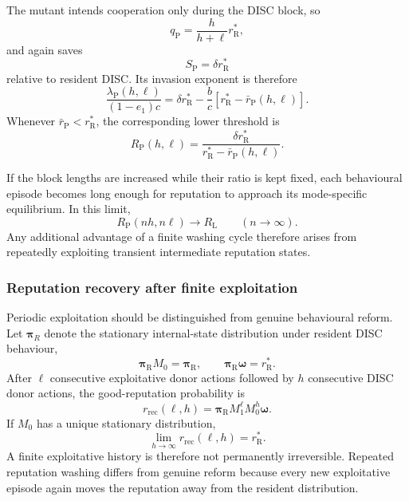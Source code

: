 \documentclass[fleqn,10pt]{wlscirep}
\begin{document}
The mutant intends cooperation only during the DISC block, so
\begin{equation}
q_\mathrm P
=
\frac{h}{h+\ell}r_\mathrm R^*,
\end{equation}
and again saves
\begin{equation}
S_\mathrm P
=
\delta r_\mathrm R^*
\end{equation}
relative to resident DISC.
Its invasion exponent is therefore
\begin{equation}
\frac{\lambda_\mathrm P(h,\ell)}{(1-e_1)c}
=
\delta r_\mathrm R^*
-
\frac{b}{c}
\left[
r_\mathrm R^*-\bar r_\mathrm P(h,\ell)
\right].
\label{eq:SI_periodic_invasion}
\end{equation}
Whenever $\bar r_\mathrm P<r_\mathrm R^*$, the corresponding lower threshold is
\begin{equation}
R_\mathrm P(h,\ell)
=
\frac{\delta r_\mathrm R^*}
{r_\mathrm R^*-\bar r_\mathrm P(h,\ell)}.
\label{eq:SI_periodic_threshold}
\end{equation}

If the block lengths are increased while their ratio is kept fixed, each behavioural episode becomes long enough for reputation to approach its mode-specific equilibrium.
In this limit,
\begin{equation}
R_\mathrm P(nh,n\ell)
\rightarrow
R_\mathrm L
\qquad
(n\rightarrow\infty).
\end{equation}
Any additional advantage of a finite washing cycle therefore arises from repeatedly exploiting transient intermediate reputation states.

\subsubsection{Reputation recovery after finite exploitation}

Periodic exploitation should be distinguished from genuine behavioural reform.
Let $\boldsymbol{\pi}_R$ denote the stationary internal-state distribution under resident DISC behaviour,
\begin{equation}
\boldsymbol{\pi}_\mathrm RM_0
=
\boldsymbol{\pi}_\mathrm R,
\qquad
\boldsymbol{\pi}_\mathrm R\boldsymbol{\omega}
=
r_\mathrm R^*.
\end{equation}
After $\ell$ consecutive exploitative donor actions followed by $h$ consecutive DISC donor actions, the good-reputation probability is
\begin{equation}
r_{\mathrm{rec}}(\ell,h)
=
\boldsymbol{\pi}_\mathrm R
M_1^\ell
M_0^h
\boldsymbol{\omega}.
\label{eq:SI_recovery}
\end{equation}
If $M_0$ has a unique stationary distribution,
\begin{equation}
\lim_{h\to\infty}
r_{\mathrm{rec}}(\ell,h)
=
r_\mathrm R^*.
\end{equation}
A finite exploitative history is therefore not permanently irreversible.
Repeated reputation washing differs from genuine reform because every new exploitative episode again moves the reputation away from the resident distribution.
\end{document}
